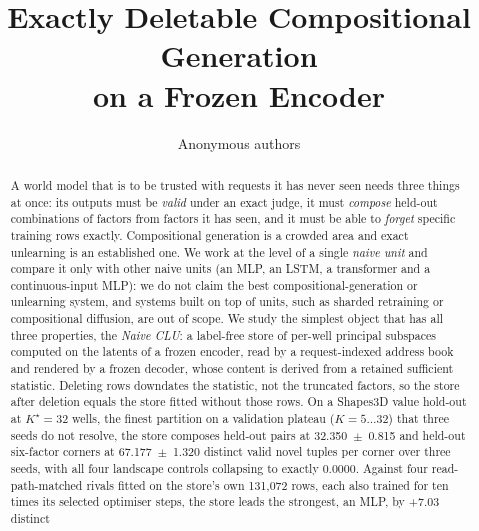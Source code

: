 \documentclass{article} %
\title{Exactly Deletable Compositional Generation\\ on a Frozen Encoder}
\author{Anonymous authors}
\newcommand{\Kstar}{\ensuremath{K^{\star}}}
\begin{document}
\maketitle

\begin{abstract}
A world model that is to be trusted with requests it has never seen needs three things at
once: its outputs must be \emph{valid} under an exact judge, it must \emph{compose}
held-out combinations of factors from factors it has seen, and it must be able to
\emph{forget} specific training rows exactly. Compositional generation is a crowded area
and exact unlearning is an established one. We work at the level of a single \emph{naive unit} and
compare it only with other naive units (an MLP, an LSTM, a transformer and a continuous-input MLP):
we do not claim the best compositional-generation or unlearning system, and systems built on top of
units, such as sharded retraining or compositional diffusion, are out of scope.
We study the simplest object that has all three properties, the \emph{Naive CLU}: a
label-free store of per-well principal subspaces computed on the latents of a frozen
encoder, read by a request-indexed address book and rendered by a frozen decoder, whose
content is derived from a retained sufficient statistic. Deleting rows downdates the
statistic, not the truncated factors, so the store after deletion equals the store fitted
without those rows. On a Shapes3D value hold-out at $\Kstar=32$ wells, the finest partition on a validation plateau
($K=5\ldots32$) that three seeds do not resolve, %
the store composes held-out pairs at 32.350~$\pm$~0.815 and held-out six-factor corners at
67.177~$\pm$~1.320 distinct valid novel tuples per corner over three seeds, with all four landscape
controls collapsing to exactly 0.0000. %
Against four read-path-matched rivals fitted on the store's own 131,072 rows, each also trained for
ten times its selected optimiser steps, the store leads the strongest, an MLP, by +7.03 distinct

\end{abstract}
\end{document}
